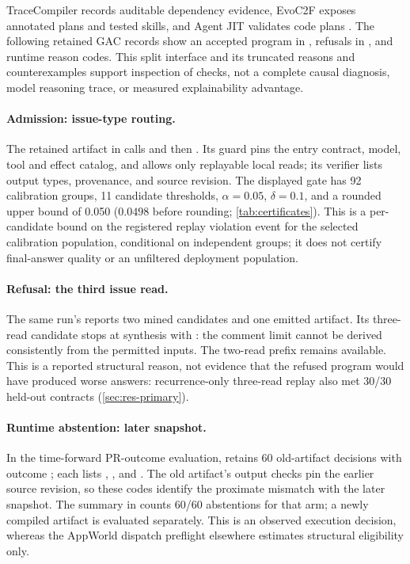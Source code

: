 TraceCompiler records auditable dependency evidence, EvoC2F exposes annotated
plans and tested skills, and Agent JIT validates code plans
\citep{elyadouni2026tracecompiler,wei2026evoc2f,winston2026agentjit}.
The following retained GAC records show an accepted program in ,
refusals in , and runtime reason codes. This split interface
and its truncated reasons and counterexamples support inspection of checks,
not a complete causal diagnosis, model reasoning trace, or measured
explainability advantage.

\paragraph{Admission: issue-type routing.}
The retained artifact in
calls  and then
. Its guard pins the entry
contract, model, tool and effect catalog, and allows only replayable local
reads; its verifier lists output types, provenance, and source revision.
The displayed gate has 92 calibration groups, 11 candidate thresholds,
$\alpha=0.05$, $\delta=0.1$, and a rounded upper bound of 0.050
($0.0498$ before rounding; \cref{tab:certificates}). This is a
per-candidate bound on the registered replay violation event for the selected
calibration population, conditional on independent groups; it does not
certify final-answer quality or an unfiltered deployment population.

\paragraph{Refusal: the third issue read.}
The same run's
reports two mined candidates and one emitted artifact. Its three-read
candidate stops at synthesis with
:
the comment limit cannot be derived consistently from the permitted inputs.
The two-read prefix remains available. This is a reported structural reason,
not evidence that the refused program would have produced worse answers:
recurrence-only three-read replay also met 30/30 held-out contracts
(\cref{sec:res-primary}).

\paragraph{Runtime abstention: later snapshot.}
In the time-forward PR-outcome evaluation,
retains 60 old-artifact decisions with outcome ; each lists
, , and
. The old artifact's output checks pin
the earlier source revision, so these codes identify the proximate mismatch
with the later snapshot. The summary in
 counts 60/60
abstentions for that arm; a newly compiled artifact is evaluated separately.
This is an observed execution decision, whereas the AppWorld dispatch
preflight elsewhere estimates structural eligibility only.
